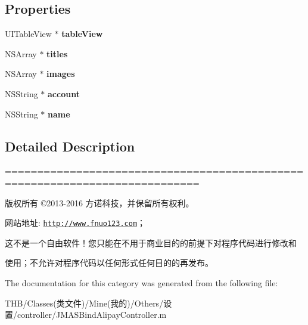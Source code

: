 \subsection*{Properties}
\begin{DoxyCompactItemize}
\item 
\mbox{\label{category_j_m_a_s_bind_alipay_controller_07_08_ada11c79dbedee85565b42e1d2b1c3241}} 
U\+I\+Table\+View $\ast$ {\bfseries table\+View}
\item 
\mbox{\label{category_j_m_a_s_bind_alipay_controller_07_08_a853b00f03008def18a3973a7d205373c}} 
N\+S\+Array $\ast$ {\bfseries titles}
\item 
\mbox{\label{category_j_m_a_s_bind_alipay_controller_07_08_a9f2ab797a7be87c2ca3b2742bba7df7c}} 
N\+S\+Array $\ast$ {\bfseries images}
\item 
\mbox{\label{category_j_m_a_s_bind_alipay_controller_07_08_a06c0cea28206e6c30c3377e3ce2539ac}} 
N\+S\+String $\ast$ {\bfseries account}
\item 
\mbox{\label{category_j_m_a_s_bind_alipay_controller_07_08_ad4717859c4cf54154e1e802abc850101}} 
N\+S\+String $\ast$ {\bfseries name}
\end{DoxyCompactItemize}


\subsection{Detailed Description}
============================================================================

版权所有 ©2013-\/2016 方诺科技，并保留所有权利。

网站地址\+: \href{http://www.fnuo123.com}{\tt http\+://www.\+fnuo123.\+com}； 



这不是一个自由软件！您只能在不用于商业目的的前提下对程序代码进行修改和

使用；不允许对程序代码以任何形式任何目的的再发布。 

 

The documentation for this category was generated from the following file\+:\begin{DoxyCompactItemize}
\item 
T\+H\+B/\+Classes(类文件)/\+Mine(我的)/\+Others/设置/controller/J\+M\+A\+S\+Bind\+Alipay\+Controller.\+m\end{DoxyCompactItemize}
